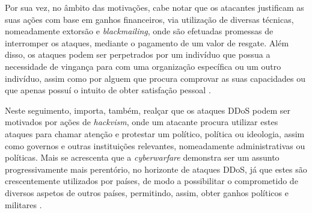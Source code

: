Por sua vez, no âmbito das motivações, cabe notar que os atacantes justificam as suas ações com base em ganhos financeiros, via utilização de diversas técnicas, nomeadamente extorsão e \textit{blackmailing}, onde são efetuadas promessas de interromper os ataques, mediante o pagamento de um valor de resgate. Além disso, os ataques podem ser perpetrados por um indivíduo que possua a necessidade de vingança para com uma organização específica ou um outro indivíduo, assim como por alguem que procura comprovar as suas capacidades ou que apenas possuí o intuito de obter satisfação pessoal \cite{cybergc_defending_agaisnt_ddos,perimeter81_ddos_motivations}.


Neste seguimento, importa, também, realçar que os ataques DDoS podem ser motivados por ações de \textit{hackvism}, onde um atacante procura utilizar estes ataques para chamar atenção e protestar um político, política ou ideologia, assim como governos e outras instituições relevantes, nomeadamente administrativas ou políticas. Mais se acrescenta que a \textit{cyberwarfare} demonstra ser um assunto progressivamente mais perentório, no horizonte de ataques DDoS, já que estes são crescentemente utilizados por países, de modo a possibilitar o comprometido de diversos aspetos de outros países, permitindo, assim, obter ganhos políticos e militares \cite{cybergc_defending_agaisnt_ddos,perimeter81_ddos_motivations}.